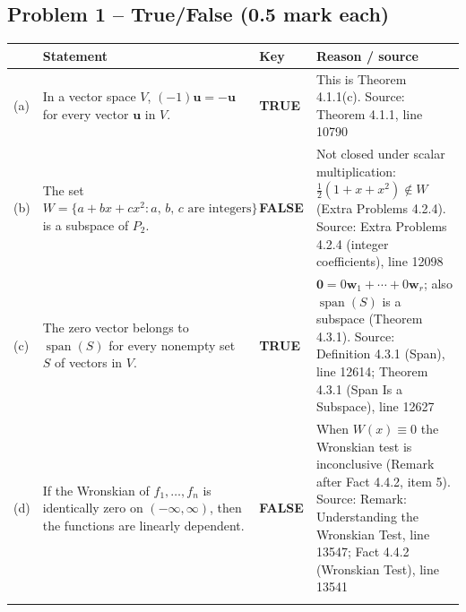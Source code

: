 \documentclass[11pt,a4paper]{article}
\newcommand{\Src}[1]{{\footnotesize\color{black!65}Source: #1}}
\begin{document}
\subsection*{Problem 1 -- True/False (0.5 mark each)}
\begin{tabularx}{\linewidth}{@{}l >{\raggedright\arraybackslash}X l >{\raggedright\arraybackslash}X@{}}\toprule & Statement & Key & Reason / source\\\midrule
(a) & In a vector space $V$, $(-1)\mathbf{u}=-\mathbf{u}$ for every vector $\mathbf{u}$ in $V$. & \textbf{TRUE} & This is Theorem 4.1.1(c). \Src{Theorem 4.1.1, line 10790}\\\addlinespace
(b) & The set $W=\{a+bx+cx^2 : a,\,b,\,c \text{ are integers}\}$ is a subspace of $P_2$. & \textbf{FALSE} & Not closed under scalar multiplication: $\tfrac12(1+x+x^2)\notin W$ (Extra Problems 4.2.4). \Src{Extra Problems 4.2.4 (integer coefficients), line 12098}\\\addlinespace
(c) & The zero vector belongs to $\operatorname{span}(S)$ for every nonempty set $S$ of vectors in $V$. & \textbf{TRUE} & $\mathbf{0}=0\mathbf{w}_1+\cdots+0\mathbf{w}_r$; also $\operatorname{span}(S)$ is a subspace (Theorem 4.3.1). \Src{Definition 4.3.1 (Span), line 12614; Theorem 4.3.1 (Span Is a Subspace), line 12627}\\\addlinespace
(d) & If the Wronskian of $f_1,\dots,f_n$ is identically zero on $(-\infty,\infty)$, then the functions are linearly dependent. & \textbf{FALSE} & When $W(x)\equiv0$ the Wronskian test is inconclusive (Remark after Fact 4.4.2, item 5). \Src{Remark: Understanding the Wronskian Test, line 13547; Fact 4.4.2 (Wronskian Test), line 13541}\\\addlinespace
\bottomrule\end{tabularx}
\end{document}
